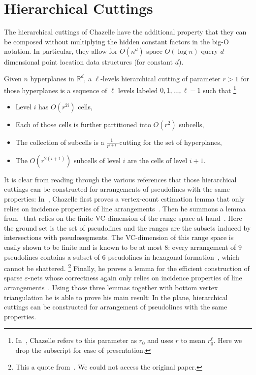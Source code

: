 \section{\done Hierarchical Cuttings}%
\label{sec:divide-and-conquer:hierarchical-cuttings}

The hierarchical cuttings of Chazelle
have the additional property that they can be composed without multiplying the
hidden constant factors in the big-O notation. In particular, they allow
for \(O(n^d)\)-space \(O(\log n)\)-query \(d\)-dimensional point location data
structures (for constant \(d\)).
\ifjournal
  \begin{definition}
    Given \(n\) hyperplanes in \(\mathbb{R}^d\),
    a \(\ell\)-levels hierarchical cutting of parameter \(r > 1\)
    for those hyperplanes
    is a sequence of \(\ell\) levels labeled \(0,1, \ldots, \ell - 1\)
    such that%
    \footnote{In~\cite{C93}, Chazelle refers to this parameter as
    \(r_0\) and uses \(r\) to mean \(r_0^\ell\). Here we drop the subscript for
    ease of presentation.}
    \begin{itemize}
      \item Level \(i\) has \(O(r^{2i})\) cells,
      \item Each of those cells is further partitioned into \(O(r^2)\)
        subcells,
      \item The collection of subcells is a \(\frac{1}{r^{i+1}}\)-cutting for
        the set of hyperplanes,
      \item The \(O(r^{2(i+1)})\) subcells of level \(i\) are the cells of level \(i+1\).
    \end{itemize}
  \end{definition}
  It is clear from reading through the various references that those
  hierarchical cuttings can be constructed for arrangements of pseudolines with
  the same properties:
  In~\cite{C93},
  Chazelle first proves a vertex-count estimation lemma
  that only relies on incidence properties of line
  arrangements~\cite[Lemma~2.1]{C93}. Then he summons a lemma from~\cite{Ma93}
  that relies on the finite VC-dimension of the range space at
  hand~\cite[Lemma~3.1]{C93}.
  Here the ground set is the set of pseudolines and the ranges are the
  subsets induced by intersections with pseudosegments.
  The VC-dimension of this range space
  is easily shown to be finite and is known to be at most
  \(8\): every arrangement of \(9\) pseudolines contains a subset of
  \(6\) pseudolines in hexagonal formation~\cite{HM94}, which cannot be
  shattered.%
  \footnote{This a quote from~\cite{BMP05}. We could not access
  the original paper.}
  Finally, he proves a lemma for the efficient construction of
  sparse \(\varepsilon\)-nets whose correctness again only relies on incidence
  properties of line arrangements~\cite[Lemma 3.2]{C93}.
  Using those three lemmas together with bottom vertex triangulation he is
  able to prove his main result:
\else%
In the plane, hierarchical cuttings can be
constructed for arrangement of pseudolines with the same properties.
\fi

